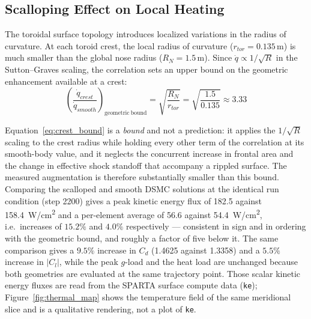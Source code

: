\subsection{Scalloping Effect on Local Heating}
The toroidal surface topology introduces localized variations in the radius of curvature. At each toroid crest, the local radius of curvature ($r_{tor} = 0.135$\,m) is much smaller than the global nose radius ($R_N = 1.5$\,m). Since $\dot{q} \propto 1/\sqrt{R}$ in the Sutton--Graves scaling, the correlation sets an upper bound on the geometric enhancement available at a crest:
\begin{equation}
    \left(\frac{\dot{q}_{crest}}{\dot{q}_{smooth}}\right)_{\mathrm{geometric\ bound}} = \sqrt{\frac{R_N}{r_{tor}}} = \sqrt{\frac{1.5}{0.135}} \approx 3.33
    \label{eq:crest_bound}
\end{equation}

Equation~\eqref{eq:crest_bound} is a \emph{bound} and not a prediction: it applies the $1/\sqrt{R}$ scaling to the crest radius while holding every other term of the correlation at its smooth-body value, and it neglects the concurrent increase in frontal area and the change in effective shock standoff that accompany a rippled surface. The measured augmentation is therefore substantially smaller than this bound. Comparing the scalloped and smooth DSMC solutions at the identical run condition (step 2200) gives a peak kinetic energy flux of 182.5 against 158.4~W/cm\textsuperscript{2} and a per-element average of 56.6 against 54.4~W/cm\textsuperscript{2}, i.e.\ increases of $15.2\%$ and $4.0\%$ respectively --- consistent in sign and in ordering with the geometric bound, and roughly a factor of five below it. The same comparison gives a $9.5\%$ increase in $C_d$ (1.4625 against 1.3358) and a $5.5\%$ increase in $|C_l|$, while the peak $g$-load and the heat load are unchanged because both geometries are evaluated at the same trajectory point. Those scalar kinetic energy fluxes are read from the SPARTA surface compute data (\texttt{ke}); Figure~\ref{fig:thermal_map} shows the temperature field of the same meridional slice and is a qualitative rendering, not a plot of \texttt{ke}.

